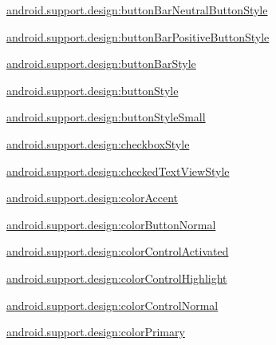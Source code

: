 {\ttfamily \hyperlink{classandroid_1_1support_1_1design_1_1R_1_1styleable_a4599da08b2e1afe7ea7a57322f4c6e3a}{android.\+support.\+design\+:button\+Bar\+Neutral\+Button\+Style}}

{\ttfamily \hyperlink{classandroid_1_1support_1_1design_1_1R_1_1styleable_ad6dccbdc26acca166bca4b6b693c30aa}{android.\+support.\+design\+:button\+Bar\+Positive\+Button\+Style}}

{\ttfamily \hyperlink{classandroid_1_1support_1_1design_1_1R_1_1styleable_a434b825974ffc445f7d2c1c0ebca20c2}{android.\+support.\+design\+:button\+Bar\+Style}}

{\ttfamily \hyperlink{classandroid_1_1support_1_1design_1_1R_1_1styleable_ae0dbe579dfa57a5cbc98e488b1a7d61b}{android.\+support.\+design\+:button\+Style}}

{\ttfamily \hyperlink{classandroid_1_1support_1_1design_1_1R_1_1styleable_ab5e406e1fb26b0441b85e2dc760d1898}{android.\+support.\+design\+:button\+Style\+Small}}

{\ttfamily \hyperlink{classandroid_1_1support_1_1design_1_1R_1_1styleable_a02bb9011b2cb08a21cec78bbaccf85f0}{android.\+support.\+design\+:checkbox\+Style}}

{\ttfamily \hyperlink{classandroid_1_1support_1_1design_1_1R_1_1styleable_a2c04271b29c4402ba6651dc55d3c3730}{android.\+support.\+design\+:checked\+Text\+View\+Style}}

{\ttfamily \hyperlink{classandroid_1_1support_1_1design_1_1R_1_1styleable_ade0801de138ef167ffaf75a110ce48b0}{android.\+support.\+design\+:color\+Accent}}

{\ttfamily \hyperlink{classandroid_1_1support_1_1design_1_1R_1_1styleable_ab55fa86e1ca1799c130f3c2f5b8ef8a1}{android.\+support.\+design\+:color\+Button\+Normal}}

{\ttfamily \hyperlink{classandroid_1_1support_1_1design_1_1R_1_1styleable_af7ed613c3f87592a89ab7e391abb7b7d}{android.\+support.\+design\+:color\+Control\+Activated}}

{\ttfamily \hyperlink{classandroid_1_1support_1_1design_1_1R_1_1styleable_a08a5b7e63a775cd41fec28def9a2e28f}{android.\+support.\+design\+:color\+Control\+Highlight}}

{\ttfamily \hyperlink{classandroid_1_1support_1_1design_1_1R_1_1styleable_acb676a1a9b146706ffe3ae4186403c10}{android.\+support.\+design\+:color\+Control\+Normal}}

{\ttfamily \hyperlink{classandroid_1_1support_1_1design_1_1R_1_1styleable_acffdce3af4b9cdfe390c502719236f7e}{android.\+support.\+design\+:color\+Primary}}

